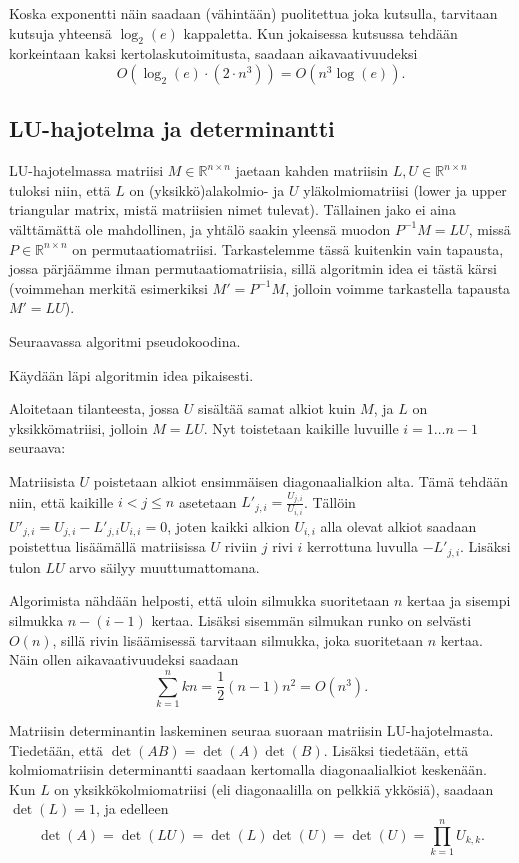 \documentclass[10pt,a4paper,titlepage]{article}
\newcommand{\R}{\ensuremath{\mathbb{R}}}
\newcommand{\pseudo}[1]{{\small}}
\begin{document}
Koska exponentti näin saadaan (vähintään) puolitettua joka kutsulla, tarvitaan kutsuja yhteensä $\log_2(e)$ kappaletta.
Kun jokaisessa kutsussa tehdään korkeintaan kaksi kertolaskutoimitusta, saadaan aikavaativuudeksi
$$
O\left( \log_2(e)\cdot \left( 2 \cdot n^3 \right) \right) = O\left(n^3\log(e) \right).
$$

\subsection{LU-hajotelma ja determinantti}
\label{sec:LU}

LU-hajotelmassa matriisi $M\in\R^{n\times n}$ jaetaan kahden matriisin $L,U\in\R^{n\times n}$ tuloksi niin, että 
$L$ on (yksikkö)alakolmio- ja $U$ yläkolmiomatriisi (lower ja upper triangular matrix, mistä matriisien nimet tulevat).
Tällainen jako ei aina välttämättä ole mahdollinen, ja yhtälö saakin yleensä muodon $P^{-1}M = LU$, missä $P\in\R^{n\times n}$ on
permutaatiomatriisi. Tarkastelemme tässä kuitenkin vain tapausta, jossa pärjäämme ilman permutaatiomatriisia,
sillä algoritmin idea ei tästä kärsi (voimmehan merkitä esimerkiksi $M' = P^{-1}M$, jolloin voimme tarkastella tapausta $M' = LU$).

Seuraavassa algoritmi pseudokoodina.

\pseudo{LU}

Käydään läpi algoritmin idea pikaisesti.

Aloitetaan tilanteesta, jossa $U$ sisältää samat alkiot kuin $M$, ja $L$ on yksikkömatriisi, jolloin $M = LU$. Nyt toistetaan kaikille luvuille $i = 1\ldots n-1$ seuraava:

Matriisista $U$ poistetaan alkiot ensimmäisen diagonaalialkion alta.
Tämä tehdään niin, että kaikille $i < j \leq n$ asetetaan $L'_{j,i} = \frac{U_{j,i}}{U_{i,i}}$.
Tällöin $U'_{j,i} = U_{j,i} - L'_{j,i}U_{i,i} = 0$, joten kaikki alkion $U_{i,i}$ alla olevat alkiot saadaan poistettua lisäämällä
matriisissa $U$ riviin $j$ rivi $i$ kerrottuna luvulla $-L'_{j,i}$. Lisäksi tulon $LU$ arvo säilyy muuttumattomana.

Algorimista nähdään helposti, että uloin silmukka suoritetaan $n$ kertaa ja sisempi silmukka $n - (i-1)$ kertaa. Lisäksi sisemmän silmukan 
runko on selvästi $O(n)$, sillä rivin lisäämisessä tarvitaan silmukka, joka suoritetaan $n$ kertaa. Näin ollen aikavaativuudeksi saadaan
$$
\sum_{k=1}^n kn = \frac{1}{2} (n-1)n^2 = O\left(n^3\right).
$$

Matriisin determinantin laskeminen seuraa suoraan matriisin LU-hajotelmasta.
Tiedetään, että $\det(AB) = \det(A)\det(B)$. Lisäksi tiedetään, että kolmiomatriisin determinantti saadaan kertomalla
diagonaalialkiot keskenään. Kun $L$ on yksikkökolmiomatriisi (eli diagonaalilla on pelkkiä ykkösiä), saadaan
$\det(L) = 1$, ja edelleen
$$
\det(A) = \det(LU) = \det(L)\det(U) = \det(U) = \prod_{k=1}^n U_{k,k}.
$$
\end{document}

